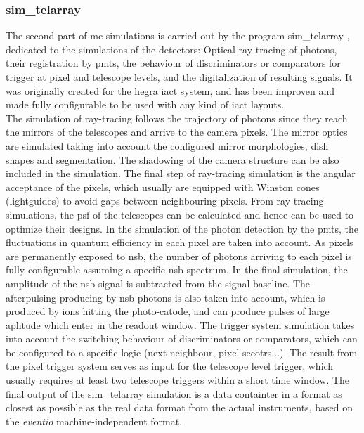 \documentclass[main.tex]{subfiles}
\begin{document}
\subsubsection{sim\_telarray}

The second part of \gls{mc} simulations is carried out by the program sim\_telarray \cite{2008corsikanadsimtelarray}, dedicated to the simulations of the detectors: Optical ray-tracing of photons, their registration by \glspl{pmt}, the behaviour of discriminators or comparators for trigger at pixel and telescope levels, and the digitalization of resulting signals. It was originally created for the \gls{hegra} \gls{iact} system, and has been improven and made fully configurable to be used with any kind of \gls{iact} layouts.\\
The simulation of ray-tracing follows the trajectory of photons since they reach the mirrors of the telescopes and arrive to the camera pixels. The mirror optics are simulated taking into account the configured mirror morphologies, dish shapes and segmentation. The shadowing of the camera structure can be also included in the simulation. The final step of ray-tracing simulation is the angular acceptance of the pixels, which usually are equipped with Winston cones (lightguides) to avoid gaps between neighbouring pixels. From ray-tracing simulations, the \gls{psf} of the telescopes can be calculated and hence can be used to optimize their designs. In the simulation of the photon detection by the \glspl{pmt}, the fluctuations in quantum efficiency in each pixel are taken into account.  As pixels are permanently exposed to \gls{nsb}, the number of photons arriving to each pixel is fully configurable assuming a specific \gls{nsb} spectrum. In the final simulation, the amplitude of the \gls{nsb} signal is subtracted from the signal baseline. The afterpulsing producing by \gls{nsb} photons is also taken into account, which is produced by ions hitting the photo-catode, and can produce pulses of large aplitude which enter in the readout window. The trigger system simulation takes into account the switching behaviour of discriminators or comparators, which can be configured to a specific logic (next-neighbour, pixel secotrs...). The result from the pixel trigger system serves as input for the telescope level trigger, which usually requires at least two telescope triggers within a short time window. The final output of the sim\_telarray simulation is a data containter in a format as closest as possible as the real data format from the actual instruments, based on the \textit{eventio} machine-independent format.
\end{document}
